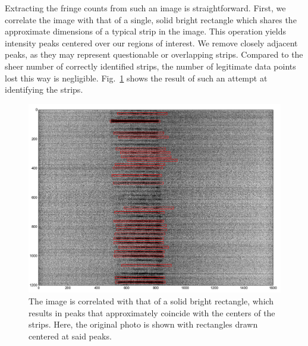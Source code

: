 \documentclass[11.5pt,oneside]{book}
\newcommand*{\figref}[1]{Fig.~\ref{#1}}
\begin{document}
Extracting the fringe counts from such an image is straightforward. First, we
correlate the image with that of a single, solid bright rectangle which shares
the approximate dimensions of a typical strip in the image. This operation
yields intensity
peaks centered over our regions of interest. We remove closely adjacent peaks,
as they may represent questionable or overlapping strips. Compared to the sheer
number of correctly identified strips, the number of legitimate data points lost
this way is negligible. \figref{fig:globalsizing-identifystrips} shows the
result of such an attempt at identifying the strips.

\begin{figure}[h]
    \centering
    \includegraphics[height=0.38\textheight]{img/globalsizing-identifystrips.png}
    \caption{The image is correlated with that of a solid bright rectangle, which
        results in peaks that approximately coincide with the centers of the
        strips. Here, the original photo is shown with rectangles drawn centered
    at said peaks.}
    \label{fig:globalsizing-identifystrips}
\end{figure}
\end{document}
